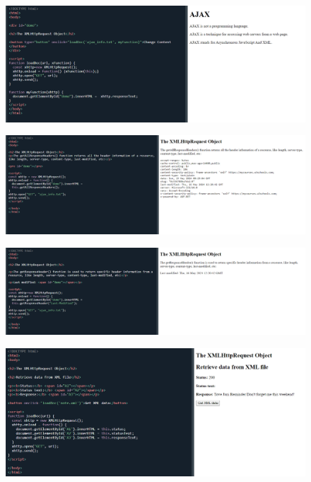 \documentclass{article}
\begin{document}
\begin{itemize}
		\begin{figure}[H]
			\centering
			\includegraphics[width=1.0\textwidth,keepaspectratio]{img/F4.png}
		\end{figure}

		\begin{figure}[H]
			\centering
			\includegraphics[width=1.0\textwidth,keepaspectratio]{img/F5.png}
		\end{figure}

		\begin{figure}[H]
			\centering
			\includegraphics[width=1.0\textwidth,keepaspectratio]{img/F6.png}
		\end{figure}

		\begin{figure}[H]
			\centering
			\includegraphics[width=1.0\textwidth,keepaspectratio]{img/F7.png}
		\end{figure}


\end{itemize}
\end{document}
